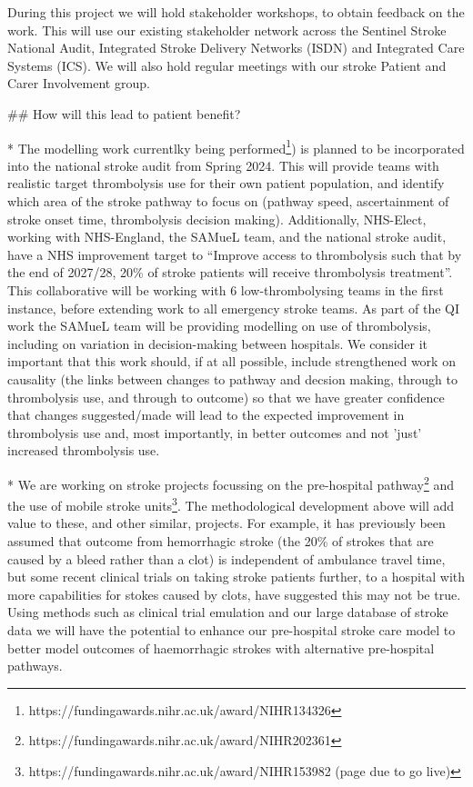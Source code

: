 \begin{markdown}
During this project we will hold stakeholder workshops, to obtain feedback on the work. This will use our existing stakeholder network across the Sentinel Stroke National Audit, Integrated Stroke Delivery Networks (ISDN) and Integrated Care Systems (ICS). We will also hold regular meetings with our stroke Patient and Carer Involvement group.

## How will this lead to patient benefit?

* The modelling work currentlky being performed\footnote{https://fundingawards.nihr.ac.uk/award/NIHR134326}) is planned to be incorporated into the national stroke audit from Spring 2024. This will provide teams with realistic target thrombolysis use for their own patient population, and identify which area of the stroke pathway to focus on (pathway speed, ascertainment of stroke onset time, thrombolysis decision making). Additionally, NHS-Elect, working with NHS-England, the SAMueL team, and the national stroke audit, have a NHS improvement target to “Improve access to thrombolysis such that by the end of 2027/28, 20\% of stroke patients will receive thrombolysis treatment”. This collaborative will be working with 6 low-thrombolysing teams in the first instance, before extending work to all emergency stroke teams. As part of the QI work the SAMueL team will be providing modelling on use of thrombolysis, including on variation in decision-making between hospitals. We consider it important that this work should, if at all possible, include strengthened work on causality (the links between changes to pathway and decsion making, through to thrombolysis use, and through to outcome) so that we have greater confidence that changes suggested/made will lead to the expected improvement in thrombolysis use and, most importantly, in better outcomes and not 'just' increased thrombolysis use.

* We are working on stroke projects focussing on the pre-hospital pathway\footnote{https://fundingawards.nihr.ac.uk/award/NIHR202361} and the use of mobile stroke units\footnote{https://fundingawards.nihr.ac.uk/award/NIHR153982 (page due to go live)}. The methodological development above will add value to these, and other similar, projects. For example, it has previously been assumed that outcome from hemorrhagic stroke (the 20\% of strokes that are caused by a bleed rather than a clot) is independent of ambulance travel time, but some recent clinical trials on taking stroke patients further, to a hospital with more capabilities for stokes caused by clots, have suggested this may not be true. Using methods such as clinical trial emulation and our large database of stroke data we will have the potential to enhance our pre-hospital stroke care model to better model outcomes of haemorrhagic strokes with alternative pre-hospital pathways.


\end{markdown}
